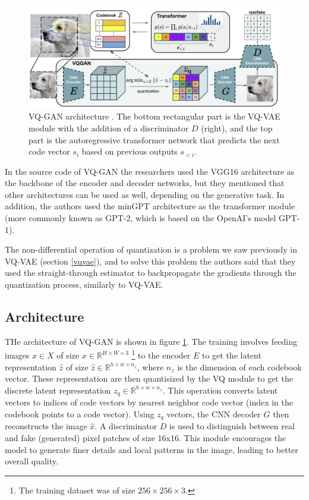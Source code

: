 \begin{figure}
    \centering
    \includegraphics[width=\textwidth]{images/vqgan_architecture.png}
    \caption{VQ-GAN architecture \cite{vqgan}. The bottom rectangular part is the VQ-VAE module with the addition of a discriminator $D$ (right), and the top part is the autoregressive transformer network that predicts the next code vector $s_i$ based on previous outputs $s_{<i}$.}
    \label{fig:vqgan_architecture}
\end{figure}

In the source code of VQ-GAN the researchers used the VGG16 \cite{vgg16} architecture as the backbone of the encoder and decoder networks, but they mentioned that other architectures can be used as well, depending on the generative task. In addition, the authors used the minGPT \cite{mingpt} architecture as the transformer module (more commonly known as GPT-2, which is based on the OpenAI's model GPT-1).

The non-differential operation of quantization is a problem we saw previously in VQ-VAE (section \ref{vqvae}), and to solve this problem the authors said that they used the straight-through estimator \cite{ste} to backpropagate the gradients through the quantization process, similarly to VQ-VAE.






\subsection{Architecture}

THe architecture of VQ-GAN is shown in figure \ref{fig:vqgan_architecture}. The training involves feeding images $x \in X$ of size $x \in \mathbb{R}^{H \times W \times 3}$ \footnote[2]{The training dataset was of size $256 \times 256 \times 3$.} to the encoder $E$ to get the latent representation $\hat{z}$ of size $\hat{z} \in \mathbb{R}^{h \times w \times n_z}$, where $n_z$ is the dimension of each codebook vector. These representation are then quantisized by the VQ module to get the discrete latent representation $z_q \in \mathbb{R}^{h \times w \times n_z}$. This operation converts latent vectors to indices of code vectors by nearest neighbor code vector (index in the codebook points to a code vector). Using $z_q$ vectors, the CNN decoder $G$ then reconstructs the image $\hat{x}$. A discriminator $D$ is used to distinguish between real and fake (generated) pixel patches of size 16x16. This module encourages the model to generate finer details and local patterns in the image, leading to better overall quality.

